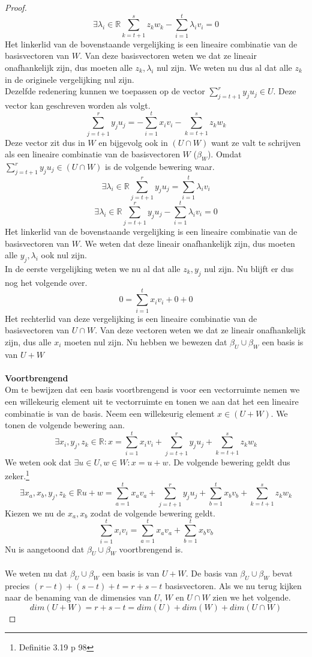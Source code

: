 \documentclass[lineaire_algebra_oplossingen.tex]{subfiles}
\begin{document}
\begin{proof}
\[\]
\[
\exists \lambda_i \in \mathbb{R} \sum_{k=t+1}^sz_kw_k - \sum_{i=1}^t\lambda_iv_i = 0 
\]
Het linkerlid van de bovenstaande vergelijking is een lineaire combinatie van de basisvectoren van $W$. Van deze basisvectoren weten we dat ze lineair onafhankelijk zijn, dus moeten alle $z_k, \lambda_i$ nul zijn. We weten nu dus al dat alle $z_k$ in de originele vergelijking nul zijn.\\
Dezelfde redenering kunnen we toepassen op de vector $\sum_{j=t+1}^ry_ju_j \in U$. Deze vector kan geschreven worden als volgt.
\[
\sum_{j=t+1}^ry_ju_j= -\sum_{i=1}^tx_iv_i - \sum_{k=t+1}^sz_kw_k
\]
Deze vector zit dus in $W$ en bijgevolg ook in $(U\cap W)$ want ze valt te schrijven als een lineaire combinatie van de basisvectoren $W$ ($\beta_W$). Omdat $\sum_{j=t+1}^ry_ju_j \in (U\cap W)$ is de volgende bewering waar.
\[
\exists \lambda_i \in \mathbb{R} \sum_{j=t+1}^ry_ju_j = \sum_{i=1}^t\lambda_iv_i
\]
\[
\exists \lambda_i \in \mathbb{R} \sum_{j=t+1}^ry_ju_j - \sum_{i=1}^t\lambda_iv_i = 0 
\]
Het linkerlid van de bovenstaande vergelijking is een lineaire combinatie van de basisvectoren van $W$. We weten dat deze lineair onafhankelijk zijn, dus moeten alle $y_j,  \lambda_i$ ook nul zijn.\\
In de eerste vergelijking weten we nu al dat alle $z_k,y_j$ nul zijn. Nu blijft er dus nog het volgende over.
\[
0 = \sum_{i=1}^tx_iv_i + 0 + 0
\]
Het rechterlid van deze vergelijking is een lineaire combinatie van de basisvectoren van $U\cap W$. Van deze vectoren weten we dat ze lineair onafhankelijk zijn, dus alle $x_i$ moeten nul zijn.
Nu hebben we bewezen dat $\beta_U\cup \beta_W$ een basis is van $U+W$\\\\
\textbf{Voortbrengend}\\
Om te bewijzen dat een basis voortbrengend is voor een vectorruimte nemen we een willekeurig element uit te vectorruimte en tonen we aan dat het een lineaire combinatie is van de basis.
Neem een willekeurig element $x \in (U + W)$. We tonen de volgende bewering aan.
\[
\exists x_i,y_j,z_k \in \mathbb{R}: x = \sum_{i=1}^tx_iv_i + \sum_{j=t+1}^ry_ju_j + \sum_{k=t+1}^sz_kw_k
\]
We weten ook dat $\exists u\in U, w\in W: x = u+w$. De volgende bewering geldt dus zeker.\footnote{Definitie 3.19 p 98}
\[
\exists x_a,x_b,y_j,z_k \in \mathbb{R}  u+w = \sum_{a=1}^tx_av_a + \sum_{j=t+1}^ry_ju_j + \sum_{b=1}^tx_bv_b + \sum_{k=t+1}^sz_kw_k
\]
Kiezen we nu de $x_a,x_b$ zodat de volgende bewering geldt.
\[
\sum_{i=1}^tx_iv_i = \sum_{a=1}^tx_av_a + \sum_{b=1}^tx_bv_b 
\]
Nu is aangetoond dat $\beta_U \cup \beta_W$ voortbrengend is.
\\\\ 
We weten nu dat $\beta_U \cup \beta_W$ een basis is van $U+W$. De basis van $\beta_U \cup \beta_W$ bevat precies $(r-t)+(s-t)+t = r+s-t$ basisvectoren. Als we nu terug kijken naar de benaming van de dimensies van $U$, $W$ en $U\cap W$ zien we het volgende.
\[
dim(U+W) = r+s-t = dim(U) + dim(W) + dim(U \cap W)
\]
\end{proof}
\end{document}
